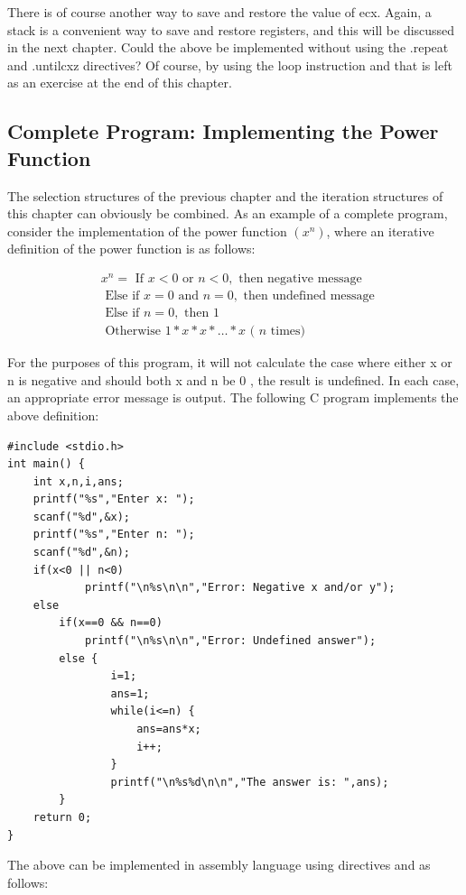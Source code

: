 \documentclass[10pt]{article}
\begin{document}
There is of course another way to save and restore the value of ecx. Again, a stack is a convenient way to save and restore registers, and this will be discussed in the next chapter. Could the above be implemented without using the .repeat and .untilcxz directives? Of course, by using the loop instruction and that is left as an exercise at the end of this chapter.

\subsection*{Complete Program: Implementing the Power Function}
The selection structures of the previous chapter and the iteration structures of this chapter can obviously be combined. As an example of a complete program, consider the implementation of the power function $\left(x^{n}\right)$, where an iterative definition of the power function is as follows:

$$
\begin{aligned}
& x^{n}=\text { If } x<0 \text { or } n<0, \text { then negative message } \\
& \text { Else if } x=0 \text { and } n=0, \text { then undefined message } \\
& \text { Else if } n=0, \text { then } 1 \\
& \text { Otherwise } 1 * x * x * \ldots * x \text { ( } n \text { times) }
\end{aligned}
$$

For the purposes of this program, it will not calculate the case where either x or n is negative and should both x and n be 0 , the result is undefined. In each case, an appropriate error message is output. The following C program implements the above definition:

\begin{verbatim}
#include <stdio.h>
int main() {
    int x,n,i,ans;
    printf("%s","Enter x: ");
    scanf("%d",&x);
    printf("%s","Enter n: ");
    scanf("%d",&n);
    if(x<0 || n<0)
            printf("\n%s\n\n","Error: Negative x and/or y");
    else
        if(x==0 && n==0)
            printf("\n%s\n\n","Error: Undefined answer");
        else {
                i=1;
                ans=1;
                while(i<=n) {
                    ans=ans*x;
                    i++;
                }
                printf("\n%s%d\n\n","The answer is: ",ans);
        }
    return 0;
}
\end{verbatim}

The above can be implemented in assembly language using directives and as follows:
\end{document}
